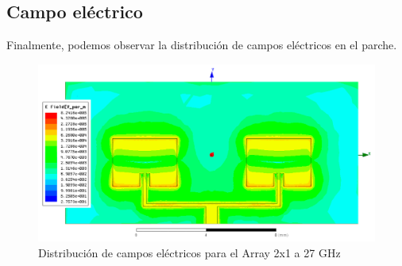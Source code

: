 \newpage
\subsection{Campo eléctrico}
\par Finalmente, podemos observar la distribución de campos eléctricos en el parche.
\begin{figure}[H]
    \centering
        \includegraphics[width=\textwidth]{archivos/analisis/2x13/8}
        \caption{Distribución de campos eléctricos para el Array 2x1 a 27 GHz}
        \label{fig:elec2x13}
\end{figure}


